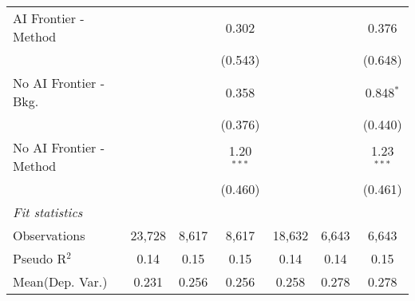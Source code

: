 \begin{tabular}{lcccccc}
   AI Frontier - Method    &               &              & 0.302        &               &             & 0.376\\   
                           &               &              & (0.543)      &               &             & (0.648)\\   
   No AI Frontier - Bkg.   &               &              & 0.358        &               &             & 0.848$^{*}$\\   
                           &               &              & (0.376)      &               &             & (0.440)\\   
   No AI Frontier - Method &               &              & 1.20$^{***}$ &               &             & 1.23$^{***}$\\   
                           &               &              & (0.460)      &               &             & (0.461)\\   
   \midrule
   \emph{Fit statistics}\\
   Observations            & 23,728        & 8,617        & 8,617        & 18,632        & 6,643       & 6,643\\  
   Pseudo R$^2$            & 0.14          & 0.15         & 0.15         & 0.14          & 0.14        & 0.15\\  
Mean(Dep. Var.) & 0.231 & 0.256 & 0.256 & 0.258 & 0.278 & 0.278 \\
   

\end{tabular}

